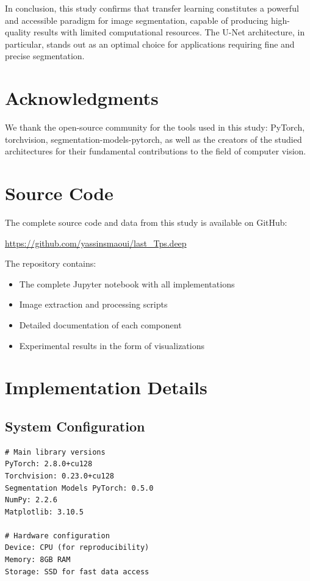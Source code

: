 \documentclass[12pt,a4paper]{article}
\begin{document}
In conclusion, this study confirms that transfer learning constitutes a powerful and accessible paradigm for image segmentation, capable of producing high-quality results with limited computational resources. The U-Net architecture, in particular, stands out as an optimal choice for applications requiring fine and precise segmentation.

\section*{Acknowledgments}

We thank the open-source community for the tools used in this study: PyTorch, torchvision, segmentation-models-pytorch, as well as the creators of the studied architectures for their fundamental contributions to the field of computer vision.




\appendix

\section{Source Code}

The complete source code and data from this study is available on GitHub: 

\url{https://github.com/yassinsmaoui/last_Tps.deep}

The repository contains:
\begin{itemize}
    \item The complete Jupyter notebook with all implementations
    \item Image extraction and processing scripts
    \item Detailed documentation of each component
    \item Experimental results in the form of visualizations
\end{itemize}

\section{Implementation Details}

\subsection{System Configuration}

\begin{lstlisting}[caption=Experimental environment configuration]
# Main library versions
PyTorch: 2.8.0+cu128
Torchvision: 0.23.0+cu128
Segmentation Models PyTorch: 0.5.0
NumPy: 2.2.6
Matplotlib: 3.10.5

# Hardware configuration
Device: CPU (for reproducibility)
Memory: 8GB RAM
Storage: SSD for fast data access
\end{lstlisting}
\end{document}
